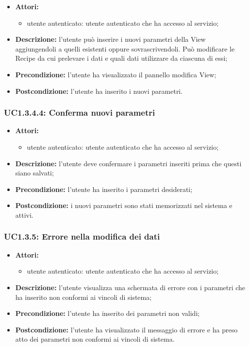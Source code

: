 \begin{itemize}
	\item \textbf{Attori:}
	\begin{itemize}
		\item utente autenticato: utente autenticato che ha accesso al servizio;
	\end{itemize}
	\item \textbf{Descrizione:} l'utente può inserire i nuovi parametri della View aggiungendoli a quelli esistenti oppure sovrascrivendoli. Può modificare le Recipe da cui prelevare i dati e quali dati utilizzare da ciascuna di essi;
	\item \textbf{Precondizione:} l'utente ha visualizzato il pannello modifica View;
	\item \textbf{Postcondizione:} l'utente ha inserito i nuovi parametri.
\end{itemize}

\subsubsection{UC1.3.4.4: Conferma nuovi parametri}

\begin{itemize}
	\item \textbf{Attori:}
	\begin{itemize}
		\item utente autenticato: utente autenticato che ha accesso al servizio;
	\end{itemize}
	\item \textbf{Descrizione:} l'utente deve confermare i parametri inseriti prima che questi siano salvati;
	\item \textbf{Precondizione:} l'utente ha inserito i parametri desiderati;
	\item \textbf{Postcondizione:} i nuovi parametri sono stati memorizzati nel sistema e attivi.
\end{itemize}

\subsubsection{UC1.3.5: Errore nella modifica dei dati}

\begin{itemize}
	\item \textbf{Attori:}
	\begin{itemize}
		\item utente autenticato: utente autenticato che ha accesso al servizio;
	\end{itemize}
	\item \textbf{Descrizione:} l'utente visualizza una schermata di errore con i parametri che ha inserito non conformi ai vincoli di sistema;
	\item \textbf{Precondizione:} l'utente ha inserito dei parametri non validi;
	\item \textbf{Postcondizione:} l'utente ha visualizzato il messaggio di errore e ha preso atto dei parametri non conformi ai vincoli di sistema.
\end{itemize}

